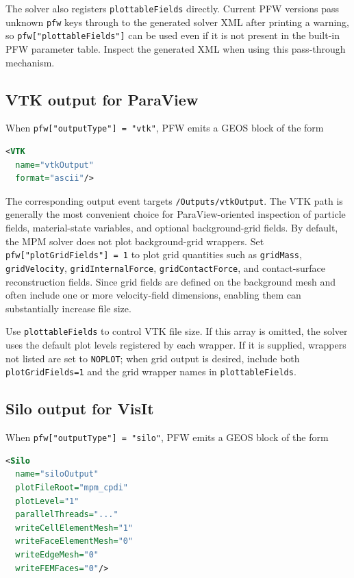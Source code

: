 The solver also registers \texttt{plottableFields} directly.  Current PFW versions pass unknown \texttt{pfw} keys through to the generated solver XML after printing a warning, so \texttt{pfw["plottableFields"]} can be used even if it is not present in the built-in PFW parameter table.  Inspect the generated XML when using this pass-through mechanism.

\subsection{VTK output for ParaView}
\label{sec:pfw-vtk-output}

When \texttt{pfw["outputType"] = "vtk"}, PFW emits a GEOS block of the form
\begin{lstlisting}[language=XML,caption={Output block generated by PFW for VTK output.}]
<VTK
  name="vtkOutput"
  format="ascii"/>
\end{lstlisting}

The corresponding output event targets \texttt{/Outputs/vtkOutput}.  The VTK path is generally the most convenient choice for ParaView-oriented inspection of particle fields, material-state variables, and optional background-grid fields.  By default, the MPM solver does not plot background-grid wrappers.  Set \texttt{pfw["plotGridFields"] = 1} to plot grid quantities such as \texttt{gridMass}, \texttt{gridVelocity}, \texttt{gridInternalForce}, \texttt{gridContactForce}, and contact-surface reconstruction fields.  Since grid fields are defined on the background mesh and often include one or more velocity-field dimensions, enabling them can substantially increase file size.

Use \texttt{plottableFields} to control VTK file size.  If this array is omitted, the solver uses the default plot levels registered by each wrapper.  If it is supplied, wrappers not listed are set to \texttt{NOPLOT}; when grid output is desired, include both \texttt{plotGridFields=1} and the grid wrapper names in \texttt{plottableFields}.

\subsection{Silo output for VisIt}
\label{sec:pfw-silo-output}

When \texttt{pfw["outputType"] = "silo"}, PFW emits a GEOS block of the form
\begin{lstlisting}[language=XML,caption={Output block generated by PFW for Silo output.}]
<Silo
  name="siloOutput"
  plotFileRoot="mpm_cpdi"
  plotLevel="1"
  parallelThreads="..."
  writeCellElementMesh="1"
  writeFaceElementMesh="0"
  writeEdgeMesh="0"
  writeFEMFaces="0"/>
\end{lstlisting}

